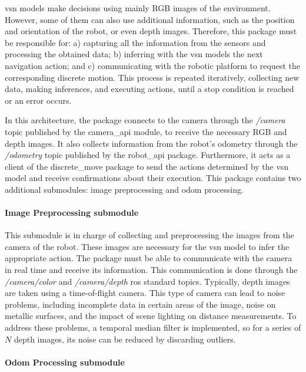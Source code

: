 \acrshort{vsn} models make decisions using mainly RGB images of the environment.
However, some of them can also use additional information, such as the position and orientation of the robot, or even depth images.
Therefore, this package must be responsible for: a) capturing all the information from the sensors and processing the obtained data; b) inferring with the \acrshort{vsn} models the next navigation action; and c) communicating with the robotic platform to request the corresponding discrete motion.
This process is repeated iteratively, collecting new data, making inferences, and executing actions, until a stop condition is reached or an error occurs.

In this architecture, the package connects to the camera through the \textit{/camera} topic published by the camera\_api module, to receive the necessary RGB and depth images.
It also collects information from the robot's odometry through the \textit{/odometry} topic published by the robot\_api package.
Furthermore, it acts as a client of the discrete\_move package to send the actions determined by the \acrshort{vsn} model and receive confirmations about their execution.
This package contains two additional submodules: image preprocessing and odom processing.

\paragraph*{Image Preprocessing submodule}\label{par:image-preprocessing}

This submodule is in charge of collecting and preprocessing the images from the camera of the robot.
These images are necessary for the \acrshort{vsn} model to infer the appropriate action.
The package must be able to communicate with the camera in real time and receive its information.
This communication is done through the \textit{/camera/color} and \textit{/camera/depth} \acrshort{ros} standard topics.
Typically, depth images are taken using a time-of-flight camera.
This type of camera can lead to noise problems, including incomplete data in certain areas of the image, noise on metallic surfaces, and the impact of scene lighting on distance measurements.
To address these problems, a temporal median filter is implemented, so for a series of $N$ depth images, its noise can be reduced by discarding outliers.

\paragraph*{Odom Processing submodule}\label{par:odom-processing}

